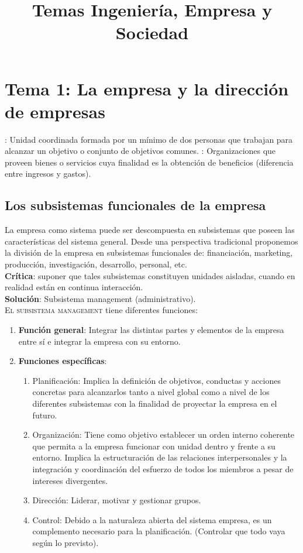 \documentclass[12pt]{article}
\title{Temas Ingeniería, Empresa y Sociedad}
\author{ }
\theoremstyle{definition_wo_parentheses}
\begin{document}
\maketitle

\section{Tema 1: La empresa y la dirección de empresas}
: Unidad coordinada formada por un mínimo de dos personas que trabajan para alcanzar un objetivo o conjunto de objetivos comunes.
: Organizaciones que proveen bienes o servicios cuya finalidad es la obtención de beneficios (diferencia entre ingresos y gastos).

\subsection{Los subsistemas funcionales de la empresa}
La empresa como sistema puede ser descompuesta en subsistemas que poseen las características del sistema general. Desde una perspectiva tradicional proponemos la división de la empresa en subsistemas funcionales de: financiación, marketing, producción, investigación, desarrollo, personal, etc.\\
\textbf{Crítica}: suponer que tales subsistemas constituyen unidades aisladas, cuando en realidad están en continua interacción.\\
\textbf{Solución}: Subsistema management (administrativo).\\

\textsc{El subsistema management} tiene diferentes funciones:
\begin{enumerate}
\item \textbf{Función general}: Integrar las distintas partes y elementos de la empresa entre sí e integrar la empresa con su entorno.
\item \textbf{Funciones específicas}: 
\begin{enumerate}
\item Planificación: Implica la definición de objetivos, conductas y acciones concretas para alcanzarlos tanto a nivel global como a nivel de los diferentes subsistemas con la finalidad de proyectar la empresa en el futuro.
\item Organización: Tiene como objetivo establecer un orden interno coherente que permita a la empresa funcionar con unidad dentro y frente a su entorno. Implica la estructuración de las relaciones interpersonales y la integración y coordinación del esfuerzo de todos los miembros a pesar de intereses divergentes.
\item Dirección: Liderar, motivar y gestionar grupos.
\item Control: Debido a la naturaleza abierta del sistema empresa, es un complemento necesario para la planificación. (Controlar que todo vaya según lo previsto).
\end{enumerate}
\end{enumerate}
\end{document}
